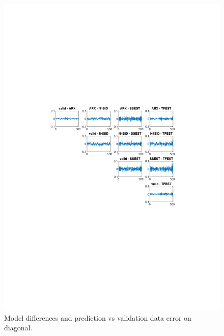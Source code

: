 \documentclass[]{article}
\begin{document}
\begin{figure}[ht]
\centering
\includegraphics[trim= 10cm 8cm 10cm 8cm, scale=0.7]{figures/pred_diff_matrix.pdf}
\caption{Model differences and prediction vs validation data error on diagonal.}
\label{fig:model_differences_prediction}
\end{figure}
\end{document}
